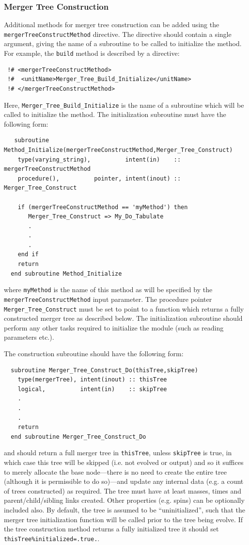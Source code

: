 \subsubsection{Merger Tree Construction}\label{sec:MergerTreeConstruction}

Additional methods for merger tree construction can be added using the {\tt mergerTreeConstructMethod} directive. The directive should contain a single argument, giving the name of a subroutine to be called to initialize the method. For example, the {\tt build} method is described by a directive:
\begin{verbatim}
 !# <mergerTreeConstructMethod>
 !#  <unitName>Merger_Tree_Build_Initialize</unitName>
 !# </mergerTreeConstructMethod>
\end{verbatim}
Here, {\tt Merger\_Tree\_Build\_Initialize} is the name of a subroutine which will be called to initialize the method. The initialization subroutine must have the following form:
\begin{verbatim}
   subroutine Method_Initialize(mergerTreeConstructMethod,Merger_Tree_Construct)
    type(varying_string),          intent(in)    :: mergerTreeConstructMethod
    procedure(),          pointer, intent(inout) :: Merger_Tree_Construct
    
    if (mergerTreeConstructMethod == 'myMethod') then
       Merger_Tree_Construct => My_Do_Tabulate
       .
       .
       .
    end if
    return
  end subroutine Method_Initialize
\end{verbatim}
where {\tt myMethod} is the name of this method as will be specified by the {\tt mergerTreeConstructMethod} input parameter. The procedure pointer {\tt Merger\_Tree\_Construct} must be set to point to a function which returns a fully constructed merger tree as described below. The initialization subroutine should perform any other tasks required to initialize the module (such as reading parameters etc.).

The construction subroutine should have the following form:
\begin{verbatim}
  subroutine Merger_Tree_Construct_Do(thisTree,skipTree)
    type(mergerTree), intent(inout) :: thisTree
    logical,          intent(in)    :: skipTree
    .
    .
    .
    return
  end subroutine Merger_Tree_Construct_Do
\end{verbatim}
and should return a full merger tree in {\tt thisTree}, unless {\tt skipTree} is true, in which case this tree will be skipped (i.e. not evolved or output) and so it suffices to merely allocate the base node---there is no need to create the entire tree (although it is permissible to do so)---and update any internal data (e.g. a count of trees constructed) as required. The tree must have at least masses, times and parent/child/sibling links created. Other properties (e.g. spins) can be optionally included also. By default, the tree is assumed to be ``uninitialized'', such that the merger tree initialization function will be called prior to the tree being evolve. If the tree construction method returns a fully initialized tree it should set {\tt thisTree\%initialized=.true.}.

